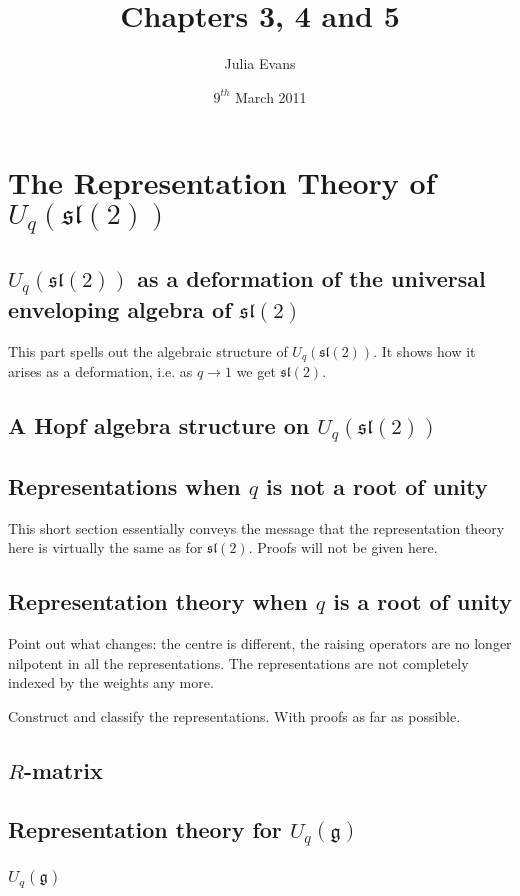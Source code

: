 \documentclass[10pt]{article}
\begin{document}

\title{Chapters 3, 4 and 5}
\author{Julia Evans}
\date{$9^{th}$ March 2011}
\maketitle
\setcounter{section}{2}
\section{The Representation Theory of $U_q(\mathfrak{sl}(2))$}
\subsection{$U_q(\mathfrak{sl}(2))$ as a deformation of the universal enveloping
  algebra of $\mathfrak{sl}(2)$}

This part spells out the algebraic structure of $U_q(\mathfrak{sl}(2))$.
It shows how it arises as a deformation, i.e. as $q\to 1$ we get
$\mathfrak{sl}(2)$.  
\subsection{A Hopf algebra structure on $U_q(\mathfrak{sl}(2))$}
\subsection{Representations when $q$ is not a root of unity}
This short section essentially conveys the message that the representation
theory here is virtually the same as for $\mathfrak{sl}(2)$.  Proofs will
not be given here.
\subsection{Representation theory when $q$ is a root of unity}
Point out what changes: the centre is different, the raising operators are
no longer nilpotent in all the representations.  The representations are
not completely indexed by the weights any more.

Construct and classify the representations.  With proofs as far as
possible.
\subsection{$R$-matrix}

\subsection{Representation theory for $U_q(\mathfrak{g})$}
\subsubsection{$U_q(\mathfrak{g})$}
\end{document}
